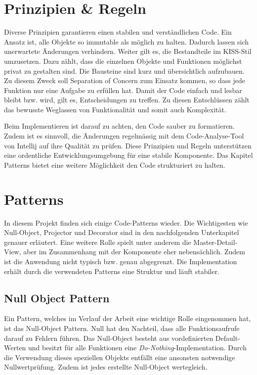 \section{Prinzipien \& Regeln}
\label{sec:principleRules}

Diverse Prinzipien garantieren einen stabilen und verständlichen Code. 
Ein Ansatz ist, alle Objekte so immutable als möglich zu halten. 
Dadurch lassen sich unerwartete Änderungen verhindern. 
Weiter gilt es, die Bestandteile im KISS-Stil umzusetzen. 
Dazu zählt, dass die einzelnen Objekte und Funktionen möglichst privat zu gestalten sind. 
Die Bausteine sind kurz und übersichtlich aufzubauen. 
Zu diesem Zweck soll Separation of Concern zum Einsatz kommen, so dass jede Funktion nur eine Aufgabe zu erfüllen hat. 
Damit der Code einfach und lesbar bleibt bzw. wird, gilt es, Entscheidungen zu treffen. 
Zu diesen Entschlüssen zählt das bewusste Weglassen von Funktionalität und somit auch Komplexität. 

Beim Implementieren ist darauf zu achten, den Code sauber zu formatieren. 
Zudem ist es sinnvoll, die Änderungen regelmässig mit dem Code-Analyse-Tool von Intellij auf ihre Qualität zu prüfen. 
Diese Prinzipien und Regeln unterstützen eine ordentliche Entwicklungsumgebung für eine stabile Komponente. 
Das Kapitel Patterns bietet eine weitere Möglichkeit den Code strukturiert zu halten. 


\section{Patterns}
\label{sec:patterns}

In diesem Projekt finden sich einige Code-Patterns wieder. 
Die Wichtigesten wie Null-Object, Projector und Decorator sind in den nachfolgenden Unterkapitel genauer erläutert. 
Eine weitere Rolle spielt unter anderem die Master-Detail-View, aber im Zusammenhang mit der Komponente eher nebensächlich. 
Zudem ist die Anwendung nicht typisch bzw. genau abgegrenzt. 
Die Implementation erhält durch die verwendeten Patterns eine Struktur und läuft stabiler. 


\subsection{Null Object Pattern}
\label{sec:nullPattern}

Ein Pattern, welches im Verlauf der Arbeit eine wichtige Rolle eingenommen hat, ist das Null-Object Pattern. 
Null hat den Nachteil, dass alle Funktionsaufrufe darauf zu Fehlern führen. 
Das Null-Object besteht aus vordefinierten Default-Werten und besitzt für alle Funktionen eine \emph{Do-Nothing}-Implementation. 
Durch die Verwendung dieses speziellen Objekts entfällt eine ansonsten notwendige Nullwertprüfung. 
Zudem ist jedes erstellte Null-Object wertegleich. 

